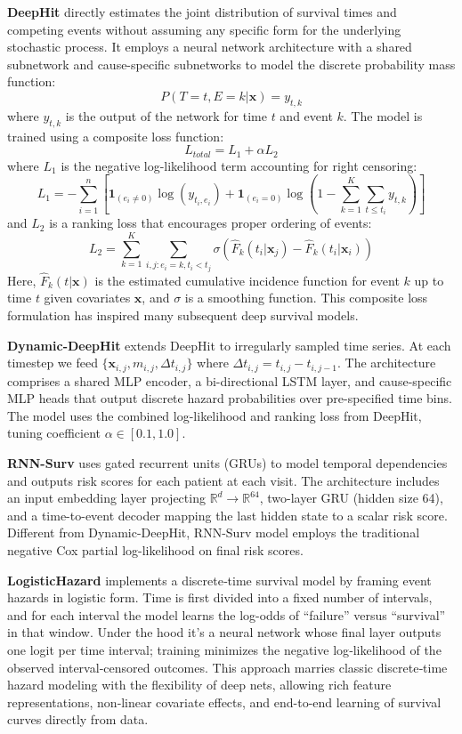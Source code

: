 \textbf{DeepHit} \cite{lee2018deephit} directly estimates the joint distribution of survival times and competing events without assuming any specific form for the underlying stochastic process. It employs a neural network architecture with a shared subnetwork and cause-specific subnetworks to model the discrete probability mass function:
\[P(T=t, E=k|\boldsymbol{x}) = y_{t,k}\]
where $y_{t,k}$ is the output of the network for time $t$ and event $k$. The model is trained using a composite loss function:
\[L_{total} = L_1 + \alpha L_2\]
where $L_1$ is the negative log-likelihood term accounting for right censoring:
\[L_1 = -\sum_{i=1}^n \left[ \mathbf{1}_{(e_i \neq 0)} \log(y_{t_i,e_i}) + \mathbf{1}_{(e_i = 0)} \log\left(1 - \sum_{k=1}^K \sum_{t \leq t_i} y_{t,k}\right) \right]\]
and $L_2$ is a ranking loss that encourages proper ordering of events:
\[L_2 = \sum_{k=1}^K \sum_{i,j: e_i=k, t_i<t_j} \sigma\left(\hat{F}_k(t_i|\boldsymbol{x}_j) - \hat{F}_k(t_i|\boldsymbol{x}_i)\right)\]
Here, $\hat{F}_k(t|\boldsymbol{x})$ is the estimated cumulative incidence function for event $k$ up to time $t$ given covariates $\boldsymbol{x}$, and $\sigma$ is a smoothing function. This composite loss formulation has inspired many subsequent deep survival models.

\textbf{Dynamic-DeepHit} \cite{lee2020dynamicdeephit} extends DeepHit to irregularly sampled time series. At each timestep we feed $\{\mathbf{x}_{i,j}, m_{i,j}, \Delta t_{i,j}\}$ where $\Delta t_{i,j} = t_{i,j} - t_{i,j-1}$. The architecture comprises a shared MLP encoder, a bi-directional LSTM layer, and cause-specific MLP heads that output discrete hazard probabilities over pre-specified time bins. The model uses the combined log-likelihood and ranking loss from DeepHit, tuning coefficient $\alpha \in [0.1, 1.0]$.

\textbf{RNN-Surv} \cite{martinez2020rnnsurv} uses gated recurrent units (GRUs) to model temporal dependencies and outputs risk scores for each patient at each visit. The architecture includes an input embedding layer projecting $\mathbb{R}^d \to \mathbb{R}^{64}$, two-layer GRU (hidden size 64), and a time-to-event decoder mapping the last hidden state to a scalar risk score. Different from Dynamic-DeepHit, RNN-Surv model employs the traditional negative Cox partial log-likelihood on final risk scores. 

\textbf{LogisticHazard} implements a discrete‐time survival model by framing event hazards in logistic form. Time is first divided into a fixed number of intervals, and for each interval the model learns the log-odds of “failure” versus “survival” in that window. Under the hood it’s a neural network whose final layer outputs one logit per time interval; training minimizes the negative log‐likelihood of the observed interval‐censored outcomes. This approach marries classic discrete‐time hazard modeling with the flexibility of deep nets, allowing rich feature representations, non‐linear covariate effects, and end-to-end learning of survival curves directly from data.

